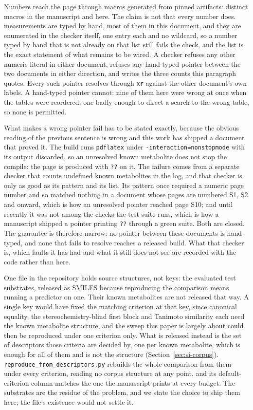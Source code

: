 \documentclass[journal=jcisd8,manuscript=suppinfo,layout=onecolumn]{achemso}
\begin{document}
Numbers reach the page through macros generated from pinned artifacts: \numProvMacrosbody{}
distinct macros in the manuscript and \numProvMacrossi{} here. The claim is not that every
number does. \numProvHandtyped{} measurements are typed by hand, most of them in this document,
and they are enumerated in the checker itself, one entry each and no wildcard, so a number
typed by hand that is not already on that list still fails the check, and the list is the exact
statement of what remains to be wired. A checker refuses any other numeric literal in either
document, refuses any hand-typed pointer between the two documents in either direction, and
writes the three counts this paragraph quotes. Every such pointer resolves through
\texttt{xr} against the other document's own labels. A hand-typed pointer cannot: nine of them here
were wrong at once when the tables were reordered, one badly enough to direct a search to the
wrong table, so none is permitted.

What makes a wrong pointer fail has to be stated exactly, because the obvious reading of the
previous sentence is wrong and this work has shipped a document that proved it. The build runs
\texttt{pdflatex} under \texttt{-interaction=nonstopmode} with its output discarded, so an
unresolved known metabolite does not stop the compile: the page is produced with \texttt{??} on it. The
failure comes from a separate checker that counts undefined known metabolites in the log, and that checker
is only as good as its pattern and its list. Its pattern once required a numeric page number and so
matched nothing in a document whose pages are numbered S1, S2 and onward, which is how an
unresolved pointer reached page S10; and until recently it was not among the checks the test suite
runs, which is how a manuscript shipped a pointer printing \texttt{??} through a green suite. Both are
closed. The guarantee is therefore narrow: no pointer between these documents is hand-typed, and
none that fails to resolve reaches a released build. What that checker is, which faults it has
had and what it still does not see are recorded with the code rather than here.

One file in the repository holds source structures, not keys: the evaluated test
substrates, released as SMILES because reproducing the comparison means running a predictor on
one. Their known metabolites are not released that way. A single key would have fixed the
matching criterion at that key, since canonical equality, the stereochemistry-blind first block
and Tanimoto similarity each need the known metabolite structure, and the sweep this paper is largely
about could then be reproduced under one criterion only. What is released instead is the set of
descriptors those criteria are decided by, one per known metabolite, which is enough for all
\numCritCriteria{} of them and is not the structure
(Section~\ref{sec:si-corpus}). \texttt{reproduce\_from\_descriptors.py} rebuilds the whole
comparison from them under every criterion, reading no corpus structure at any point, and its
default-criterion column matches the one the manuscript prints at every budget. The substrates are
the residue of the problem, and we state the choice to ship them here; the file's existence
would not settle it.
\end{document}
